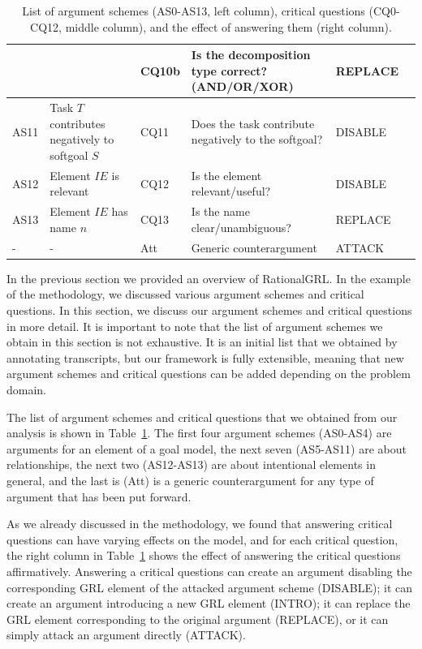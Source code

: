 \begin{table}[h]
\begin{tabularx}{\textwidth}{|l|l|l|X|l|l|}
 &  & CQ10b & Is the decomposition type correct? (AND/OR/XOR)& REPLACE\\
\hline
AS11 & Task $T$ contributes negatively to softgoal $S$& CQ11 & Does the task contribute negatively to the softgoal?& DISABLE\\
\hline
\hline
AS12 & Element $IE$ is relevant & CQ12 & Is the element relevant/useful? & DISABLE\\
\hline
AS13 & Element $IE$ has name $n$ & CQ13 & Is the name clear/unambiguous? & REPLACE\\
\hline
\hline
- & - & Att & Generic counterargument & ATTACK\\
\hline
\end{tabularx}
\caption{List of argument schemes (AS0-AS13, left column), critical questions (CQ0-CQ12, middle column), and the effect of answering them (right column).}
\label{table:argument-schemes}
\end{table}

In the previous section we provided an overview of RationalGRL. In the example of the methodology, we discussed various argument schemes and critical questions. In this section, we discuss our argument schemes and critical questions in more detail. It is important to note that the list of argument schemes we obtain in this section is not exhaustive. It is an initial list that we obtained by annotating transcripts, but our framework is fully extensible, meaning that new argument schemes and critical questions can be added depending on the problem domain.

The list of argument schemes and critical questions that we obtained from our analysis is shown in Table~\ref{table:argument-schemes}. The first four argument schemes (AS0-AS4) are arguments for an element of a goal model, the next seven (AS5-AS11) are about relationships, the next two (AS12-AS13) are about intentional elements in general, and the last is (Att) is a generic counterargument for any type of argument that has been put forward.

As we already discussed in the methodology, we found that answering critical questions can have varying effects on the model, and for each critical question, the right column in Table~\ref{table:argument-schemes} shows the effect of answering the critical questions affirmatively. Answering a critical questions can create an argument disabling the corresponding GRL element of the attacked argument scheme (\textsf{DISABLE}); it can create an argument introducing a new GRL element (\textsf{INTRO}); it can replace the GRL element corresponding to the original argument (\textsf{REPLACE}), or it can simply attack an argument directly (\textsf{ATTACK}).


